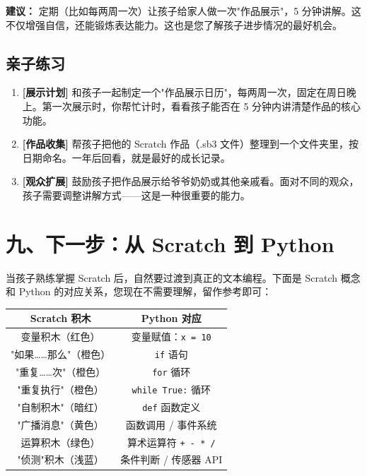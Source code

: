 \documentclass[a4paper,12pt]{ctexart}
\begin{document}
\textbf{建议：} 定期（比如每两周一次）让孩子给家人做一次"作品展示"，5 分钟讲解。这不仅增强自信，还能锻炼表达能力。这也是您了解孩子进步情况的最好机会。

\subsection*{亲子练习}

\begin{enumerate}
  \item \textbf{[展示计划]} 和孩子一起制定一个"作品展示日历"，每两周一次，固定在周日晚上。第一次展示时，你帮忙计时，看看孩子能否在 5 分钟内讲清楚作品的核心功能。
  \item \textbf{[作品收集]} 帮孩子把他的 Scratch 作品（.sb3 文件）整理到一个文件夹里，按日期命名。一年后回看，就是最好的成长记录。
  \item \textbf{[观众扩展]} 鼓励孩子把作品展示给爷爷奶奶或其他亲戚看。面对不同的观众，孩子需要调整讲解方式——这是一种很重要的能力。
\end{enumerate}

\section*{九、下一步：从 Scratch 到 Python}

当孩子熟练掌握 Scratch 后，自然要过渡到真正的文本编程。下面是 Scratch 概念和 Python 的对应关系，您现在不需要理解，留作参考即可：

\vspace{0.3cm}
\begin{center}
\begin{tabular}{|c|c|}
\hline
\textbf{Scratch 积木} & \textbf{Python 对应} \\ \hline
变量积木（红色） & 变量赋值：\texttt{x = 10} \\ \hline
"如果……那么"（橙色） & \texttt{if} 语句 \\ \hline
"重复……次"（橙色） & \texttt{for} 循环 \\ \hline
"重复执行"（橙色） & \texttt{while True:} 循环 \\ \hline
"自制积木"（暗红） & \texttt{def} 函数定义 \\ \hline
"广播消息"（黄色） & 函数调用 / 事件系统 \\ \hline
运算积木（绿色） & 算术运算符 \texttt{+ - * /} \\ \hline
"侦测"积木（浅蓝） & 条件判断 / 传感器 API \\ \hline
\end{tabular}
\end{center}
\end{document}
